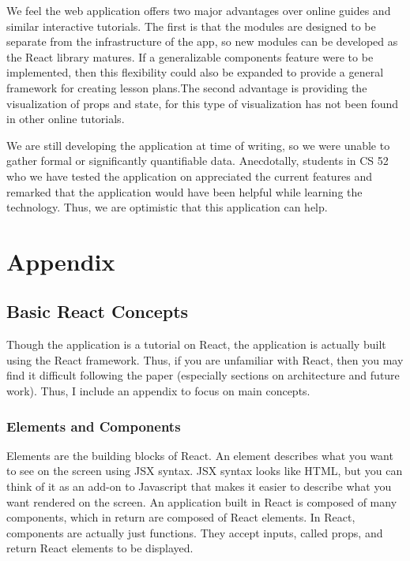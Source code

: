 \documentclass[11pt]{article}
\begin{document}
We feel the web application offers two major advantages over online guides and similar interactive tutorials. The first is that the modules are designed to be separate from the infrastructure of the app, so new modules can be developed as the React library matures. If a generalizable components feature were to be implemented, then this flexibility could also be expanded to provide a general framework for creating lesson plans.The second advantage is providing the visualization of props and state, for this type of visualization has not been found in other online tutorials.

We are still developing the application at time of writing, so we were unable to gather formal or significantly quantifiable data. Anecdotally, students in CS 52 who we have tested the application on appreciated the current features and remarked that the application would have been helpful while learning the technology. Thus, we are optimistic that this application can help.


\section{Appendix}

\subsection*{Basic React Concepts}

Though the application is a tutorial on React, the application is actually built using the React framework. Thus, if you are unfamiliar with React, then you may find it difficult following the paper (especially sections on architecture and future work). Thus, I include an appendix to focus on main concepts.

\subsubsection*{Elements and Components}

Elements are the building blocks of React. An element describes what you want to see on the screen using JSX syntax. JSX syntax looks like HTML, but you can think of it as an add-on to Javascript that makes it easier to describe what you want rendered on the screen. An application built in React is composed of many components, which in return are composed of React elements. In React, components are actually just functions. They accept inputs, called props, and return React elements to be displayed.
\end{document}

